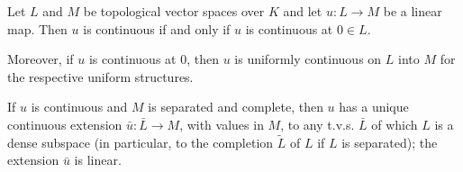 Let $L$ and $M$ be topological vector spaces over $K$ and let $u: L \to M$ be a linear map.
Then $u$ is continuous if and only if $u$ is continuous at $0 \in L$.

Moreover, if $u$ is continuous at $0$, then $u$ is uniformly continuous on $L$ into $M$ for the respective uniform structures.

If $u$ is continuous and $M$ is separated and complete, then $u$ has a unique continuous extension $\bar{u}: \bar{L} \to M$, with values in $M$, to any t.v.s. $\bar{L}$ of which $L$ is a dense subspace (in particular, to the completion $\tilde{L}$ of $L$ if $L$ is separated); the extension $\bar{u}$ is linear.
